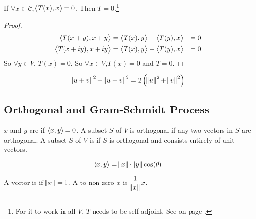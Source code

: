 \begin{theorem}\label{zerotforalltx}
    If $\forall x \in \mathcal{C}$,$\left\langle \displaystyle T(x), x \right\rangle = 0$. Then $T = 0$.\footnote{For it to work in all $V$, $T$ needs to be self-adjoint. See  on page \pageref{zerotforalltxforselfadjoint}.}
\end{theorem}
\begin{proof}
    \begin{equation*}
        \begin{aligned}
            \left\langle \displaystyle T(x+y), x+y \right\rangle &= \left\langle \displaystyle T(x), y \right\rangle + \left\langle \displaystyle T(y), x \right\rangle  &= 0 \\
            \left\langle \displaystyle T(x+iy), x+iy \right\rangle &= \left\langle \displaystyle T(x), y \right\rangle -\left\langle \displaystyle T(y), x \right\rangle &= 0            
        \end{aligned}
    \end{equation*}
    So $\forall y \in V$, $T(x) = 0$. So $\forall x \in V$,$T(x) = 0$ and $T = 0$.
\end{proof}

\begin{theorem}
    \begin{equation}
        \norm{u+v}^2 + \norm{u-v}^2 = 2 \left(\norm{u}^2 + \norm{v}^2 \right)
    \end{equation}    
\end{theorem}





\subsection{Orthogonal and Gram-Schmidt Process}

\begin{definition}
	$x$ and $y$ are  if $\left\langle \displaystyle x, y \right\rangle = 0$. A subset $S$ of $V$ is orthogonal if any two vectors in $S$ are orthogonal. A subset $S$ of $V$ is  if $S$ is orthogonal and consists entirely of unit vectors.
\end{definition}

\begin{definition}
    \begin{equation}
        \left\langle \displaystyle x, y \right\rangle = \norm{x} \cdot \norm{y} \text{cos}(\theta)
    \end{equation}    
\end{definition}


\begin{definition}
	A vector is  if $\norm{x} = 1$. A  to non-zero $x$ is $\dfrac{1}{\norm{x}} x$.
\end{definition}


